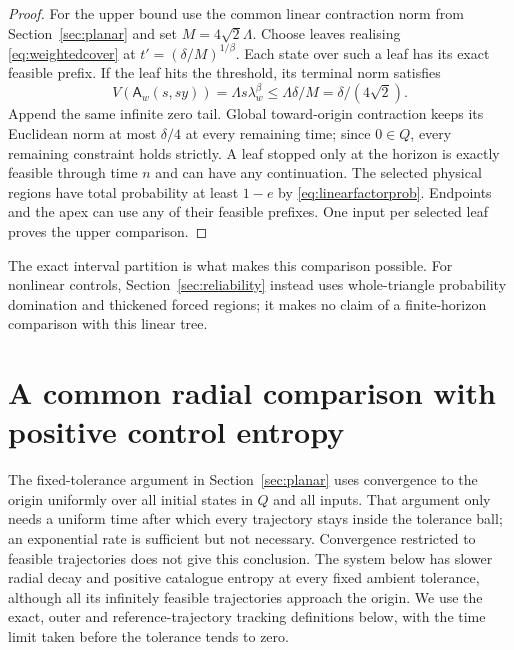 \documentclass[11pt]{amsart}
\theoremstyle{definition}
\theoremstyle{remark}
\numberwithin{equation}{section}
\begin{document}
\begin{proof}
For the upper bound use the common linear contraction norm from
Section~\ref{sec:planar} and set $M=4\sqrt2\Lambda$.
Choose leaves realising \eqref{eq:weightedcover} at
$t'=(\delta/M)^{1/\beta}$. Each state over such a leaf
has its exact feasible prefix. If the leaf hits the threshold,
its terminal norm satisfies
\[
V(\mathsf A_w(s,sy))=\Lambda s\lambda_w^\beta
                    \le\Lambda\delta/M=\delta/(4\sqrt2).
\]
Append the same infinite zero tail. Global toward-origin contraction
keeps its Euclidean norm at most $\delta/4$ at every remaining
time; since $0\in Q$, every remaining constraint holds strictly.
A leaf stopped only at the horizon is exactly feasible through
time $n$ and can have any continuation. The selected physical
regions have total probability at least $1-e$ by
\eqref{eq:linearfactorprob}. Endpoints and the apex can use any
of their feasible prefixes. One input per selected leaf proves
the upper comparison.
\end{proof}

The exact interval partition is what makes this comparison possible.
For nonlinear controls, Section~\ref{sec:reliability} instead uses
whole-triangle probability domination and thickened forced regions;
it makes no claim of a finite-horizon comparison with this linear tree.

\section{A common radial comparison with positive control entropy}
\label{app:arsinh}
The fixed-tolerance argument in Section~\ref{sec:planar} uses convergence
to the origin uniformly over all initial states in $Q$ and all inputs.
That argument only needs a uniform time after which every trajectory
stays inside the tolerance ball; an exponential rate is sufficient
but not necessary. Convergence restricted to feasible trajectories
does not give this conclusion. The system below has slower radial
decay and positive catalogue entropy at every fixed ambient tolerance,
although all its infinitely feasible trajectories approach the origin.
We use the exact, outer and reference-trajectory tracking definitions
below, with the time limit taken before the tolerance tends to zero.
\end{document}
